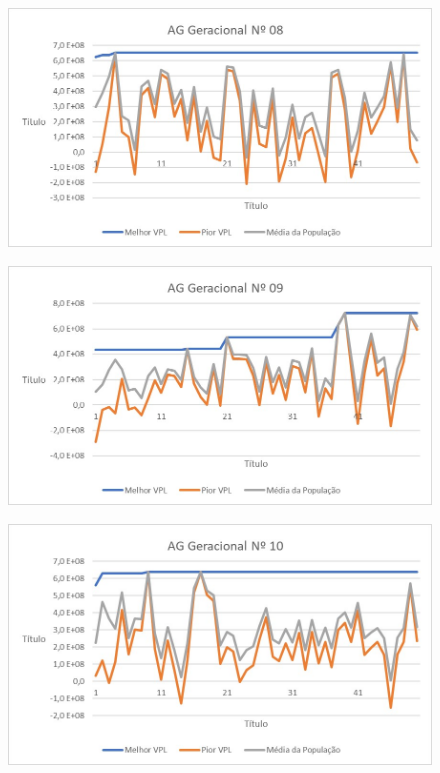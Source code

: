 \documentclass[12pt,a4paper]{report}
\begin{document}
\begin{figure}[H]
\centering

\includegraphics[scale=1]{ApB/AGG/8}

\end{figure}

\begin{figure}[H]
\centering

\includegraphics[scale=1]{ApB/AGG/9}

\end{figure}

\begin{figure}[H]
\centering

\includegraphics[scale=1]{ApB/AGG/10}

\end{figure}
\end{document}
